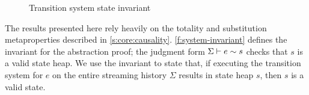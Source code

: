 \documentclass[a4paper,UKenglish,cleveref, autoref, thm-restate,anonymous]{lipics-v2021}
\begin{document}
\begin{figure}
  \begin{mathpar}
  \end{mathpar}

  \begin{mathpar}








  \end{mathpar}

  \caption{Transition system state invariant}
  \label{f:system-invariant}
\end{figure} 
The results presented here rely heavily on the totality and substitution metaproperties described in \autoref{s:core:causality}.
\autoref{f:system-invariant} defines the invariant for the abstraction proof; the judgment form $\sysinv{\Sigma}{e}{s}$ checks that $s$ is a valid state heap.
We use the invariant to state that, if executing the transition system for $e$ on the entire streaming history $\Sigma$ results in state heap $s$, then $s$ is a valid state.
\end{document}

